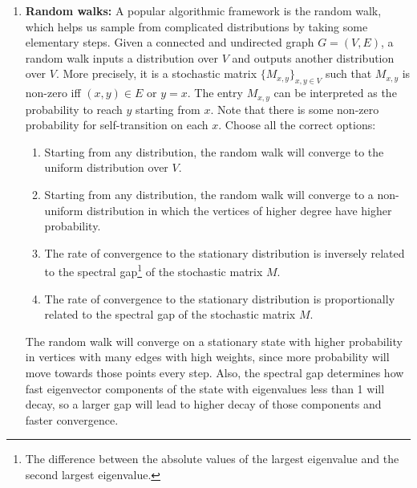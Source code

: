 \documentclass[11pt, svgnames]{article}
\begin{document}
\begin{enumerate}
(a) grows too slow and (c) grows too fast.

\item {\bf Random walks:} A popular algorithmic framework is the random walk, which helps us sample from complicated distributions by taking some elementary steps. Given a connected and undirected graph $G=(V,E)$, a random walk inputs a distribution over $V$ and outputs another distribution over $V$. More precisely, it is a stochastic matrix $\{M_{x,y}\}_{x,y\in V}$ such that $M_{x,y}$ is non-zero iff $(x,y)\in E$ or $y=x$. The entry $M_{x,y}$ can be interpreted as the probability to reach $y$ starting from $x$. Note that there is some non-zero probability for self-transition on each $x$. Choose all the correct options:
\begin{enumerate}
\item Starting from any distribution, the random walk will converge to the uniform distribution over $V$.  
\item Starting from any distribution, the random walk will converge to a non-uniform distribution in which the vertices of higher degree have higher probability.
\item The rate of convergence to the stationary distribution is inversely related to the spectral gap\footnote{The difference between the absolute values of the largest eigenvalue and the second largest eigenvalue.} of the stochastic matrix $M$.
\item The rate of convergence to the stationary distribution is proportionally related to the spectral gap of the stochastic matrix $M$.
\end{enumerate}



The random walk will converge on a stationary state with higher probability in vertices with many edges with high weights, since more probability will move towards those points every step. Also, the spectral gap determines how fast eigenvector components of the state with eigenvalues less than 1 will decay, so a larger gap will lead to higher decay of those components and faster convergence.


\end{enumerate}
\end{document}
